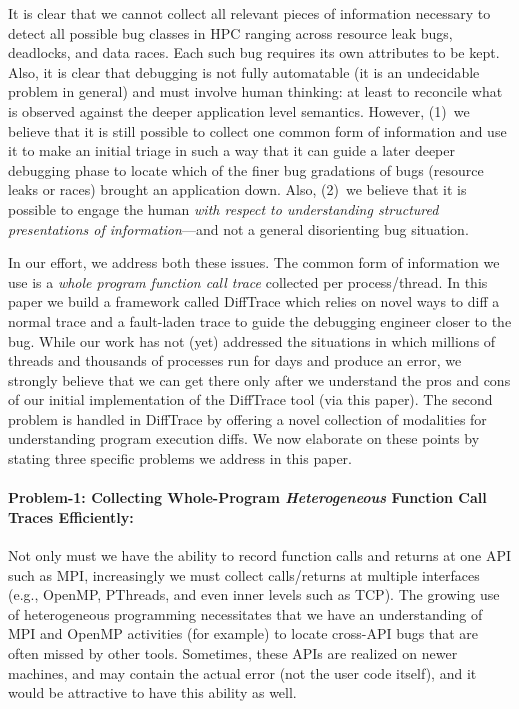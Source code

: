 It is clear that we cannot collect all relevant pieces of information
necessary to detect all possible bug classes in HPC ranging
across resource leak bugs,  deadlocks, and data races.
%
Each such bug requires its own attributes to be kept.
%
Also, it is clear that debugging is not fully automatable (it is
an undecidable problem in general) and must involve human thinking:
at least to reconcile what is observed against the deeper application
level semantics.
%
However, (1)~we believe that it is still possible to collect one common form
of information and use it to make an initial triage in such
a way that it can guide a later deeper debugging phase to locate
which of the finer bug gradations of bugs (resource leaks or races) brought
an application down.
%
Also, (2)~we believe that it is possible to engage the human {\em with respect
to understanding structured presentations of information}---and not a general
disorienting bug situation.


In our effort, we address both these issues.
%
The common form of information we use is a {\em whole program
function call trace} collected per process/thread.
%
In this paper we build a framework called DiffTrace which relies on
novel ways to diff a normal trace and a fault-laden trace to guide the
debugging engineer closer to the bug.
%
While our work has not (yet) addressed the situations in
which millions of threads and thousands of processes run
for days and produce an error,
we strongly believe that we can get there only 
after we understand the pros and cons of our initial
implementation of the  DiffTrace tool (via this paper).
%
The second problem is handled in DiffTrace by offering a novel
collection of modalities for understanding program execution diffs.
%
We now elaborate on these points by stating three specific
problems we address in this paper.



\paragraph{Problem-1: Collecting Whole-Program {\em Heterogeneous} Function Call Traces
Efficiently:\/} Not only must we have the ability
to record function calls and returns at one
API such as MPI, increasingly we must collect calls/returns at multiple
interfaces (e.g., OpenMP, PThreads, and even inner levels such as TCP).
%
The growing use of heterogeneous programming necessitates that we have
an understanding of MPI and OpenMP activities (for example) to locate cross-API
bugs that are often missed by other tools.
%
Sometimes, these APIs are realized on newer machines, and may contain the
actual error (not the user code itself), and it would be attractive to have
this ability as well.





